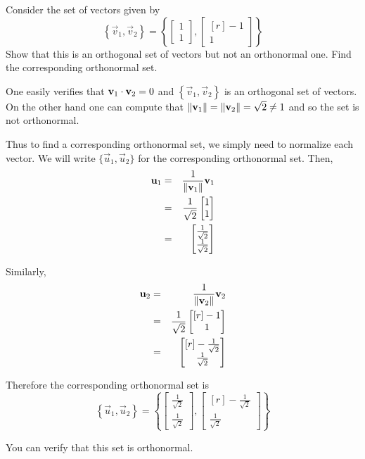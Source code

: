 \documentclass{ximera}
\begin{document}
\begin{example}\label{ex:orthonormalset}
Consider the set of vectors  given by
\[
\left\{ \vec{v}_1, \vec{v}_2 \right\} = \left\{
\begin{bmatrix}
1 \\
1
\end{bmatrix},
\begin{bmatrix}[r]
-1 \\
1
\end{bmatrix}
\right\}
\]
Show that this is an orthogonal set of vectors  but not an orthonormal one. Find the corresponding orthonormal set.

\begin{explanation}
One easily verifies that $\mathbf{v}_1 \cdot \mathbf{v}_2 = 0$ and
$\left\{ \vec{v}_1, \vec{v}_2 \right\}$ is an orthogonal set of
vectors. On the other hand one can compute that ${\left\lVert\mathbf{v}_1\right\rVert}= {\left\lVert\mathbf{v}_2\right\rVert} =
\sqrt{2} \neq 1$ and so the set is not orthonormal.

Thus to find a corresponding orthonormal set, we simply need to
normalize each vector. We will write $\{ \vec{u}_1, \vec{u}_2 \}$
for the corresponding orthonormal set. Then,
\begin{eqnarray*}
\mathbf{u}_1 &=& \frac{1}{\left\lVert\mathbf{v}_1\right\rVert}\mathbf{v}_1\\
&=& \frac{1}{\sqrt{2}} \begin{bmatrix}
1 \\
1
\end{bmatrix} \\
&=&
\begin{bmatrix}
\frac{1}{\sqrt{2}} \\
\frac{1}{\sqrt{2}}
\end{bmatrix}
\end{eqnarray*}

Similarly,
\begin{eqnarray*}
\mathbf{u}_2 &=& \frac{1}{\left\lVert\mathbf{v}_2\right\rVert}\mathbf{v}_2\\
&=& \frac{1}{\sqrt{2}} \begin{bmatrix}[r]
-1 \\
1
\end{bmatrix} \\
&=&
\begin{bmatrix}[r]
-\frac{1}{\sqrt{2}} \\
\frac{1}{\sqrt{2}}
\end{bmatrix}
\end{eqnarray*}

Therefore the corresponding orthonormal set is
\[
\left\{ \vec{u}_1, \vec{u}_2 \right\} =
\left\{
\begin{bmatrix}
\frac{1}{\sqrt{2}} \\
\frac{1}{\sqrt{2}}
\end{bmatrix},
\begin{bmatrix}[r]
-\frac{1}{\sqrt{2}} \\
\frac{1}{\sqrt{2}}
\end{bmatrix}
\right\}
\]

You can verify that this set is orthonormal.
\end{explanation}
\end{example}
\end{document}

